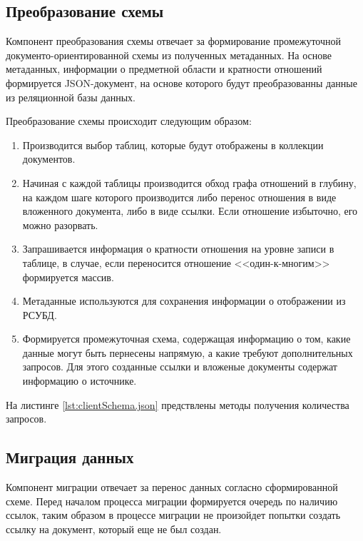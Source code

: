 \subsection{Преобразование схемы}

Компонент преобразования схемы отвечает за формирование промежуточной 
документо-ориентированной схемы из полученных метаданных. 
На основе метаданных, информации о предметной области и кратности отношений формируется JSON-документ,
на основе которого будут преобразованны данные из реляционной базы данных.

Преобразование схемы происходит следующим образом:
\begin{enumerate}
    \item Производится выбор таблиц, которые будут отображены в коллекции документов.
    \item Начиная с каждой таблицы производится обход графа отношений в глубину,
    на каждом шаге которого производится либо перенос отношения в виде вложенного документа,
    либо в виде ссылки. Если отношение избыточно, его можно разорвать.
    \item Запрашивается информация о кратности отношения на уровне записи в таблице,
    в случае, если переносится отношение <<один-к-многим>> формируется массив.
    \item Метаданные используются для сохранения информации о отображении из РСУБД.
    \item Формируется промежуточная схема, содержащая информацию о том, 
    какие данные могут быть пернесены напрямую, а какие требуют дополнительных запросов.
    Для этого созданные ссылки и вложеные документы содержат информацию о источнике.
\end{enumerate}

\clearpage

На листинге \ref{lst:clientSchema.json} предствлены методы получения количества запросов.

\clearpage




\subsection{Миграция данных}
Компонент миграции отвечает за перенос данных согласно сформированной схеме.
Перед началом процесса миграции формируется очередь по наличию ссылок, 
таким образом в процессе миграции не произойдет попытки создать ссылку на документ, 
который еще не был создан.

